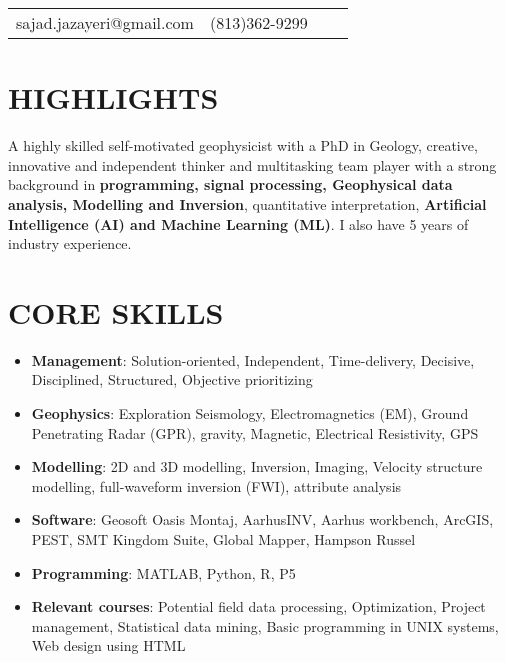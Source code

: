 \documentclass[11pt,a4paper,roman]{moderncv}        %
\begin{document}
	\makecvtitle
	\vspace*{-19mm}
	
	\begin{center}
		\begin{tabular}{ c c c c }
			\faEnvelopeO\enspace sajad.jazayeri@gmail.com &  \faMobile\enspace (813)362-9299\\  
		\end{tabular}
	\end{center}

	\vspace*{-5mm}
	\section{HIGHLIGHTS}
	A highly skilled self-motivated geophysicist with a PhD in Geology, creative, innovative and independent thinker and multitasking team player with a strong background in \textbf{programming,  signal processing, Geophysical data analysis, Modelling and Inversion}, quantitative interpretation, \textbf{Artificial Intelligence (AI) and Machine Learning (ML)}. I also have 5 years of industry experience.
	
	\section{CORE SKILLS}
	{\begin{itemize}
			\item \textbf{Management}: Solution-oriented, Independent, Time-delivery, Decisive, Disciplined, Structured, Objective prioritizing
			\item \textbf{Geophysics}: Exploration Seismology, Electromagnetics (EM), Ground Penetrating Radar (GPR), gravity, Magnetic, Electrical Resistivity, GPS
			\item \textbf{Modelling}: 2D and 3D modelling, Inversion, Imaging, Velocity structure modelling, full-waveform inversion (FWI), attribute analysis
			\item \textbf{Software}: Geosoft Oasis Montaj, AarhusINV, Aarhus workbench, ArcGIS, PEST, SMT Kingdom Suite, Global Mapper, Hampson Russel
			\item \textbf{Programming}: MATLAB, Python, R, P5
			\item \textbf{Relevant courses}: Potential field data processing, Optimization, Project management, Statistical data mining, Basic programming in UNIX systems, Web design using HTML
		\end{itemize}
	}
\end{document}
